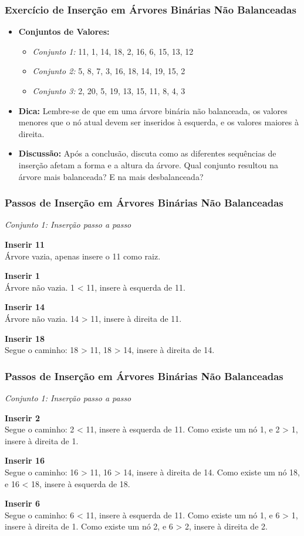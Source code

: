 \begin{frame}[fragile]
  \frametitle{Exercício de Inserção em Árvores Binárias Não Balanceadas}
  \begin{itemize}
    \item \textbf{Conjuntos de Valores:}
      \begin{itemize}
        \item \textit{Conjunto 1:} 11, 1, 14, 18, 2, 16, 6, 15, 13, 12
        \item \textit{Conjunto 2:} 5, 8, 7, 3, 16, 18, 14, 19, 15, 2
        \item \textit{Conjunto 3:} 2, 20, 5, 19, 13, 15, 11, 8, 4, 3
      \end{itemize}
    \item \textbf{Dica:} Lembre-se de que em uma árvore binária não balanceada, os valores menores que o nó atual devem ser inseridos à esquerda, e os valores maiores à direita.
    \item \textbf{Discussão:} Após a conclusão, discuta como as diferentes sequências de inserção afetam a forma e a altura da árvore. Qual conjunto resultou na árvore mais balanceada? E na mais desbalanceada?
  \end{itemize}
\end{frame}
\begin{frame}[fragile]
  \frametitle{Passos de Inserção em Árvores Binárias Não Balanceadas}
  
  \textit{Conjunto 1: Inserção passo a passo}

  \textbf{Inserir 11}\\
  Árvore vazia, apenas insere o 11 como raiz.
  
  \textbf{Inserir 1}\\
  Árvore não vazia. 1 < 11, insere à esquerda de 11.
  
  \textbf{Inserir 14}\\
  Árvore não vazia. 14 > 11, insere à direita de 11.
  
  \textbf{Inserir 18}\\
  Segue o caminho: 18 > 11, 18 > 14, insere à direita de 14.
  
\end{frame}
\begin{frame}[fragile]
  \frametitle{Passos de Inserção em Árvores Binárias Não Balanceadas}

  \textit{Conjunto 1: Inserção passo a passo}

  \textbf{Inserir 2}\\
  Segue o caminho: 2 < 11, insere à esquerda de 11. Como existe um nó 1, e 2 > 1, insere à direita de 1.

  \textbf{Inserir 16}\\
  Segue o caminho: 16 > 11, 16 > 14, insere à direita de 14. Como existe um nó 18, e 16 < 18, insere à esquerda de 18.

  \textbf{Inserir 6}\\
  Segue o caminho: 6 < 11, insere à esquerda de 11. Como existe um nó 1, e 6 > 1, insere à direita de 1. Como existe um nó 2, e 6 > 2, insere à direita de 2.


\end{frame}
